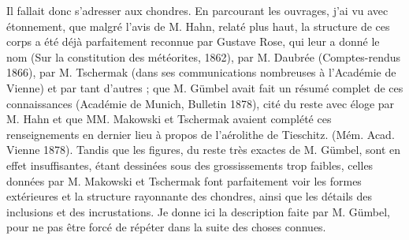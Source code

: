 \documentclass[a4paper, 12pt, oneside, french]{book}
\begin{document}
Il fallait donc s'adresser aux chondres. En parcourant les ouvrages, j'ai vu avec étonnement, que malgré l'avis de M. Hahn, relaté plus haut, la structure de ces corps a été déjà parfaitement reconnue par Gustave Rose, qui leur a donné le nom (Sur la constitution des météorites, 1862), par M. Daubrée (Comptes-rendus 1866), par M. Tschermak (dans ses communications nombreuses à l'Académie de Vienne) et par tant d'autres ; que M. Gümbel avait fait un résumé complet de ces connaissances (Académie de Munich, Bulletin 1878), cité du reste avec éloge par M. Hahn et que MM. Makowski et Tschermak avaient complété ces renseignements en dernier lieu à propos de l'aérolithe de Tieschitz. (Mém. Acad. Vienne 1878). Tandis que les figures, du reste très exactes de M. Gümbel, sont en effet insuffisantes, étant dessinées sous des grossissements trop faibles, celles données par M. Makowski et Tschermak font parfaitement voir les formes extérieures et la structure rayonnante des chondres, ainsi que les détails des inclusions et des incrustations. Je donne ici la description faite par M. Gümbel, pour ne pas être forcé de répéter dans la suite des choses connues.
\end{document}
